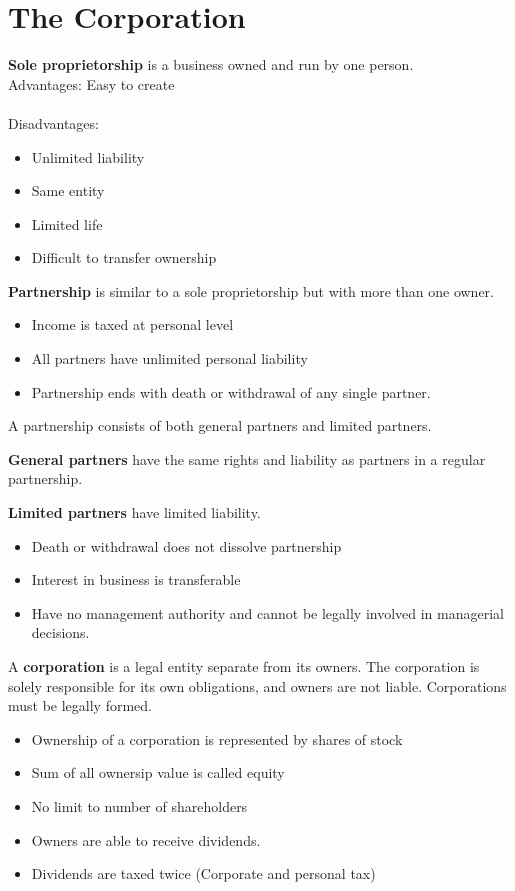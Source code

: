 \documentclass[english, 12pt]{article}
\begin{document}
\section{The Corporation}
\begin{defn}
\textbf{Sole proprietorship} is a business owned and run by one person.\\
Advantages: Easy to create\\\\
Disadvantages:
\begin{itemize}
\item Unlimited liability
\item Same entity
\item Limited life
\item Difficult to transfer ownership
\end{itemize}
\end{defn}
\begin{defn}
\textbf{Partnership} is similar to a sole proprietorship but with more than one owner.
\begin{itemize}
\item Income is taxed at personal level
\item All partners have unlimited personal liability
\item Partnership ends with death or withdrawal of any single partner.
\end{itemize}
\end{defn}
\begin{qte}
A partnership consists of both general partners and limited partners.
\end{qte}
\begin{defn}
\textbf{General partners} have the same rights and liability as partners in a regular partnership.
\end{defn}
\begin{defn}
\textbf{Limited partners} have limited liability.
\begin{itemize}
\item Death or withdrawal does not dissolve partnership
\item Interest in business is transferable
\item Have no management authority and cannot be legally involved in managerial decisions.
\end{itemize}
\end{defn}
\begin{defn}
A \textbf{corporation} is a legal entity separate from its owners. The corporation is solely responsible for its own obligations, and owners are not liable. Corporations must be legally formed.
\begin{itemize}
\item Ownership of a corporation is represented by shares of stock
\item Sum of all ownersip value is called equity
\item No limit to number of shareholders
\item Owners are able to receive dividends.
\item Dividends are taxed twice (Corporate and personal tax)
\end{itemize}
\end{defn}
\end{document}
